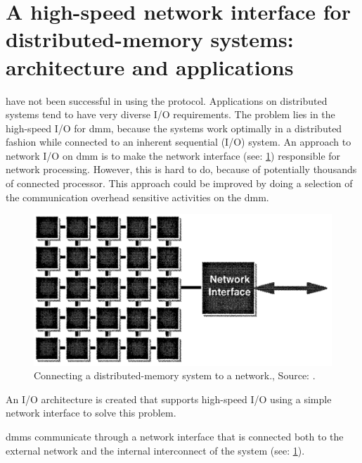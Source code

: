 
\section{A high-speed network interface for distributed-memory systems: architecture and applications \cite{steenkiste1997high}} \label{ss:steenkiste1997high}

 have not been successful in using the  protocol.
Applications on distributed systems tend to have very diverse I/O requirements.
The problem lies in the high-speed I/O for \ac{dmm}, because the systems work optimally in a distributed fashion while connected to an inherent sequential (I/O) system.
An approach to network I/O on \ac{dmm} is to make the network interface (see: \cref{fig:rep4:conndistrmem}) responsible for network processing.
However, this is hard to do, because of potentially thousands of connected processor.
This approach could be improved by doing a selection of the communication overhead sensitive activities on the \ac{dmm}.

\begin{figure}[H]
    \centering
	\includegraphics[width=0.95\linewidth]{Figures/Rep4DistrMemSys.png}
	\caption{Connecting a distributed-memory system to a network., Source: \cite{steenkiste1997high}.} 
    \label{fig:rep4:conndistrmem}
\end{figure}


\objective
An I/O architecture is created that supports high-speed I/O using a simple network interface to solve this problem.

\summary
\Ac{dmm}s communicate through a network interface that is connected both to the external network and the internal interconnect of the system (see: \cref{fig:rep4:conndistrmem}).



